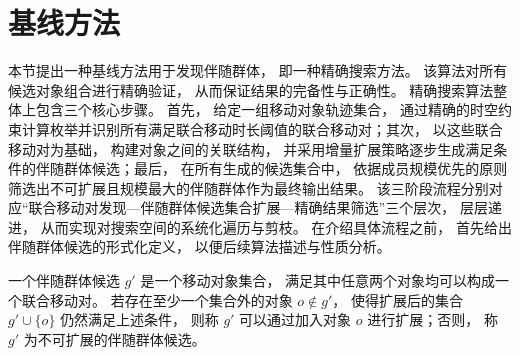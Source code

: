\section{基线方法}
\label{cm_sec:exact}

本节提出一种基线方法用于发现伴随群体， 即一种精确搜索方法。 该算法对所有候选对象组合进行精确验证， 从而保证结果的完备性与正确性。 精确搜索算法整体上包含三个核心步骤。 首先， 给定一组移动对象轨迹集合， 通过精确的时空约束计算枚举并识别所有满足联合移动时长阈值的联合移动对；其次， 以这些联合移动对为基础， 构建对象之间的关联结构， 并采用增量扩展策略逐步生成满足条件的伴随群体候选；最后， 在所有生成的候选集合中， 依据成员规模优先的原则筛选出不可扩展且规模最大的伴随群体作为最终输出结果。 该三阶段流程分别对应“联合移动对发现—伴随群体候选集合扩展—精确结果筛选”三个层次， 层层递进， 从而实现对搜索空间的系统化遍历与剪枝。 在介绍具体流程之前， 首先给出伴随群体候选的形式化定义， 以便后续算法描述与性质分析。

\begin{definition}[伴随群体候选]
一个伴随群体候选 $g'$ 是一个移动对象集合， 满足其中任意两个对象均可以构成一个联合移动对。 若存在至少一个集合外的对象 $o \notin g'$， 使得扩展后的集合 $g' \cup \{o\}$ 仍然满足上述条件， 则称 $g'$ 可以通过加入对象 $o$ 进行扩展；否则， 称 $g'$ 为不可扩展的伴随群体候选。
\end{definition}

